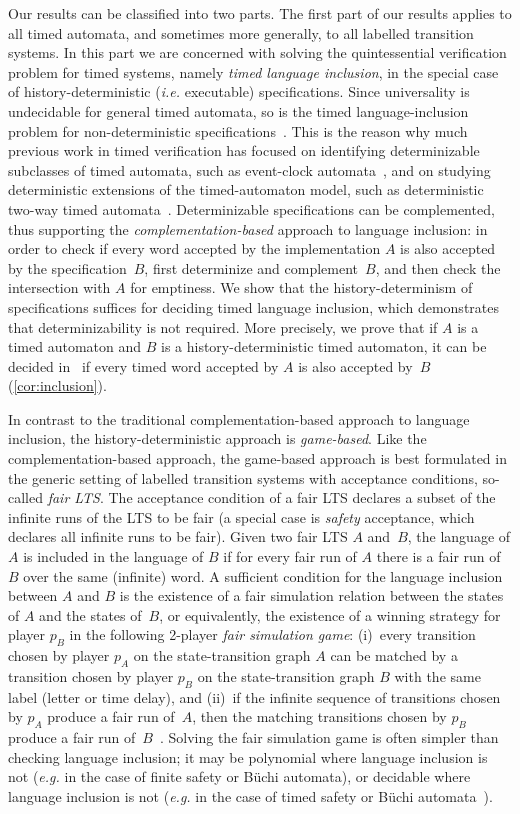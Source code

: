 Our results can be classified into two parts.
The first part of our results applies to all timed automata,
and sometimes more generally, to all labelled transition systems.
In this part we are concerned with solving the quintessential verification problem
for timed systems, namely \emph{timed language inclusion},
in the special case of history-deterministic (\emph{i.e.} executable) specifications.
Since universality is undecidable for general timed automata, so is the
timed language-inclusion problem for non-deterministic specifications~\cite{AD1994}.
This is the reason why much previous work in timed verification has focused on
identifying determinizable subclasses of timed automata,
such as event-clock automata~\cite{AFH99},
and on studying deterministic extensions of the timed-automaton model,
such as deterministic two-way timed automata~\cite{AlHe92}.
Determinizable specifications can be complemented, thus supporting the
\emph{complementation-based} approach to language inclusion:
in order to check if every word accepted by the implementation $A$ is also accepted
by the specification~$B$, first determinize and complement~$B$, and then check the
intersection with $A$ for emptiness.
We show that the history-determinism of specifications suffices for deciding timed
language inclusion, which demonstrates that determinizability is not required.
More precisely, we prove that if $A$ is a timed automaton and $B$ is a
history-deterministic timed automaton, it can be decided in \exptime\ if every timed
word accepted by $A$ is also accepted by~$B$ (\cref{cor:inclusion}).

In contrast to the traditional complementation-based approach to language inclusion,
the history-deterministic approach is \emph{game-based}.
Like the complementation-based approach, the game-based approach is best formulated
in the generic setting of labelled transition systems with acceptance conditions,
so-called \emph{fair LTS}.
The acceptance condition of a fair LTS declares a subset of the infinite runs of the
LTS to be fair
(a special case is \emph{safety} acceptance, which declares all infinite runs to be
fair). 
Given two fair LTS $A$ and~$B$, the language of $A$ is included in the language of $B$
if for every fair run of $A$ there is a fair run of $B$ over the same (infinite) word.
A sufficient condition for the language inclusion between $A$ and $B$ is the existence
of a fair simulation relation between the states of $A$ and the states of~$B$,
or equivalently, the existence of a winning strategy for player $p_B$ in the following
2-player \emph{fair simulation game}:
(i)~every transition chosen by player $p_A$ on the state-transition graph $A$
can be matched by a transition chosen by player $p_B$ on the state-transition graph $B$
with the same label (letter or time delay), and
(ii)~if the infinite sequence of transitions chosen by $p_A$ produce a fair run of~$A$,
then the matching transitions chosen by $p_B$ produce a fair run
of~$B$~\cite{HKR1997}.
Solving the fair simulation game is often simpler than checking language inclusion;
it may be polynomial where language inclusion is not
(\emph{e.g.} in the case of finite safety or B\"uchi automata),
or decidable where language inclusion is not
(\emph{e.g.} in the case of timed safety or B\"uchi automata~\cite{TAKB96}).

